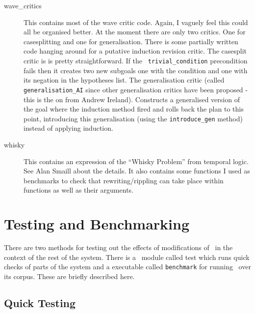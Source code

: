 \begin{description}
\item[wave\_critics] This contains most of the
  wave critic code.  Again, I vaguely feel this could all be organised
  better.  At the moment there are only two critics.
  One for casesplitting and one for
  generalisation.  There is some
  partially written code hanging around for a putative induction
  revision critic.  The casesplit critic is is pretty straightforward.  If the {\tt
    trivial\_condition} precondition
  fails then it creates two new subgoals one with
  the condition and one with its negation in the hypotheses list.  The
  generalisation critic (called {\tt
    generalisation\_AI} since other
  generalisation critics have been proposed - this is the on from
  Andrew Ireland).  Constructs a generalised version of the goal where
  the induction method fired and rolls back
  the plan to this point, introducing this generalisation (using the
  {\tt introduce\_gen} method) instead of
  applying induction.
\item[whisky] This contains an expression of the
  ``Whisky Problem'' from temporal logic.  See
  Alan Smaill about the details.  It also contains some functions I
  used as benchmarks to check that
  rewriting/rippling can take place
  within functions as well as their arguments.
\end{description}


\section{Testing and Benchmarking}

There are two methods for testing out the effects of modifications of
\lclam\ in the context of the rest of the system.  There is a
\lprolog\ module called test which runs quick checks of parts of the
system and a executable called {\tt benchmark} for
  running \lclam\ 
over its corpus.  These are briefly described here.

\subsection{Quick Testing}

